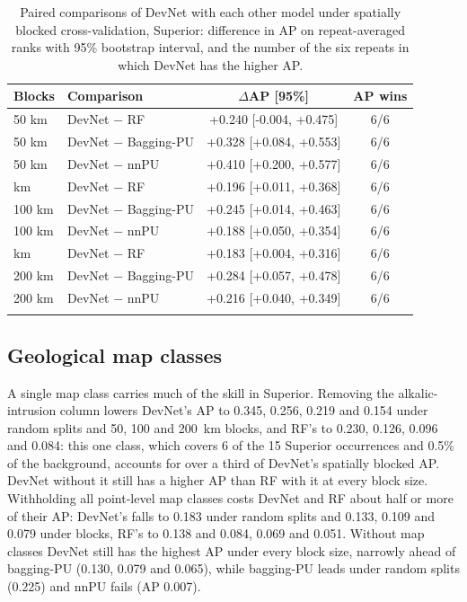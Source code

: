 \documentclass[pdflatex,sn-apa]{sn-jnl}
\begin{document}
\begin{table}[t]
\caption{Paired comparisons of DevNet with each other model under spatially blocked cross-validation, Superior: difference in AP on repeat-averaged ranks with 95\% bootstrap interval, and the number of the six repeats in which DevNet has the higher AP.}\label{tab:spatial-boot}
\footnotesize
\begin{tabular*}{\textwidth}{@{\extracolsep\fill}llcc}
\toprule
Blocks & Comparison & $\Delta$AP [95\%] & AP wins \\
\midrule
50 km & DevNet $-$ RF & +0.240 [-0.004, +0.475] & 6/6 \\
50 km & DevNet $-$ Bagging-PU & +0.328 [+0.084, +0.553] & 6/6 \\
50 km & DevNet $-$ nnPU & +0.410 [+0.200, +0.577] & 6/6 \\
\addlinespace
100 km & DevNet $-$ RF & +0.196 [+0.011, +0.368] & 6/6 \\
100 km & DevNet $-$ Bagging-PU & +0.245 [+0.014, +0.463] & 6/6 \\
100 km & DevNet $-$ nnPU & +0.188 [+0.050, +0.354] & 6/6 \\
\addlinespace
200 km & DevNet $-$ RF & +0.183 [+0.004, +0.316] & 6/6 \\
200 km & DevNet $-$ Bagging-PU & +0.284 [+0.057, +0.478] & 6/6 \\
200 km & DevNet $-$ nnPU & +0.216 [+0.040, +0.349] & 6/6 \\
\botrule
\end{tabular*}
\end{table}

\subsection{Geological map classes}\label{sec:res-featuresets}

A single map class carries much of the skill in Superior. Removing the alkalic-intrusion column lowers DevNet's AP to 0.345, 0.256, 0.219 and 0.154 under random splits and 50, 100 and 200~km blocks, and RF's to 0.230, 0.126, 0.096 and 0.084: this one class, which covers 6 of the 15 Superior occurrences and 0.5\% of the background, accounts for over a third of DevNet's spatially blocked AP. DevNet without it still has a higher AP than RF with it at every block size. Withholding all point-level map classes costs DevNet and RF about half or more of their AP: DevNet's falls to 0.183 under random splits and 0.133, 0.109 and 0.079 under blocks, RF's to 0.138 and 0.084, 0.069 and 0.051. Without map classes DevNet still has the highest AP under every block size, narrowly ahead of bagging-PU (0.130, 0.079 and 0.065), while bagging-PU leads under random splits (0.225) and nnPU fails (AP 0.007).
\end{document}
